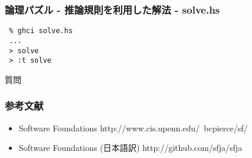 \documentclass[cjk,dvipdfm,14pt]{beamer}
\begin{document}
\begin{frame}[fragile]
\frametitle{論理パズル - 推論規則を利用した解法 - solve.hs}

\begin{lstlisting}
 % ghci solve.hs
 ...
 > solve
 > :t solve
\end{lstlisting}

\end{frame}

\begin{frame}[fragile]
質問
\end{frame}

\begin{frame}[fragile]
\frametitle{参考文献}

\begin{itemize}
\item Software Foundations http://www.cis.upenn.edu/~bcpierce/sf/
\item Software Foundations (日本語訳) http://github.com/sfja/sfja
\end{itemize}

\end{frame}


\end{document}
